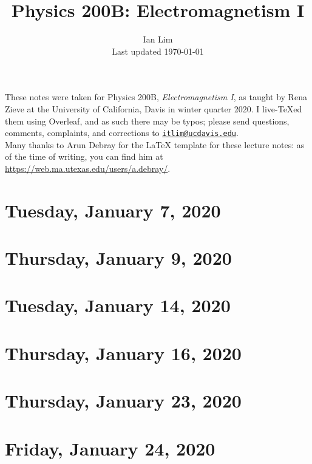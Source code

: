 \documentclass{../mynotes}
\begin{document}
\title{Physics 200B: Electromagnetism I}
\author{Ian Lim\\ Last updated \today}
\maketitle
{\small\noindent These notes were taken for Physics 200B, \emph{Electromagnetism I}, as taught by Rena Zieve at the University of California, Davis in winter quarter 2020. I live-\TeX ed them using Overleaf, and as such there may be typos; please send questions, comments, complaints, and corrections to 
\href{mailto:itlim@ucdavis.edu?subject=200B\%20Lecture\%20Notes}{\texttt{itlim@ucdavis.edu}}.\\
Many thanks to Arun Debray for the {\LaTeX} template for these lecture notes: as of the time of writing, you can find him at \url{https://web.ma.utexas.edu/users/a.debray/}.}

\tableofcontents

\section{Tuesday, January 7, 2020}
	
\section{Thursday, January 9, 2020}
    
    
\section{Tuesday, January 14, 2020}
    
\section{Thursday, January 16, 2020}
    
    
\section{Thursday, January 23, 2020}
    
\section{Friday, January 24, 2020}
    
\end{document}
